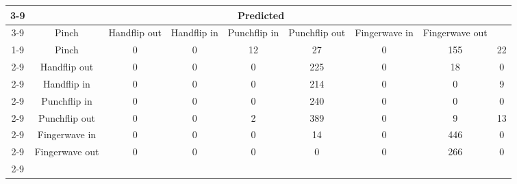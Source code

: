 \documentclass{standalone}
\begin{document}
 
 \begin{tabular}{|c |c |c |c |c |c |c |c |c |}
\cline{3-9}\multicolumn{2}{c|}{} & \multicolumn{7}{c|}{Predicted} \\ 
\cline{3-9} \multicolumn{2}{c |}{ } & Pinch & Handflip out & Handflip in & Punchflip in & Punchflip out & Fingerwave in & Fingerwave out\\ 
\cline{1-9}\multirow{7}{*}{\rotatebox[origin=c]{90}{Actual}} & Pinch & 0 & 0 & 12 & 27 & 0 & 155 & 22\\ 
 \cline{2-9} & Handflip out & 0 & 0 & 0 & 225 & 0 & 18 & 0\\ 
 \cline{2-9} & Handflip in & 0 & 0 & 0 & 214 & 0 & 0 & 9\\ 
 \cline{2-9} & Punchflip in & 0 & 0 & 0 & 240 & 0 & 0 & 0\\ 
 \cline{2-9} & Punchflip out & 0 & 0 & 2 & 389 & 0 & 9 & 13\\ 
 \cline{2-9} & Fingerwave in & 0 & 0 & 0 & 14 & 0 & 446 & 0\\ 
 \cline{2-9} & Fingerwave out & 0 & 0 & 0 & 0 & 0 & 266 & 0\\ 
 \cline{2-9}\hline \end{tabular}
 
\end{document}
